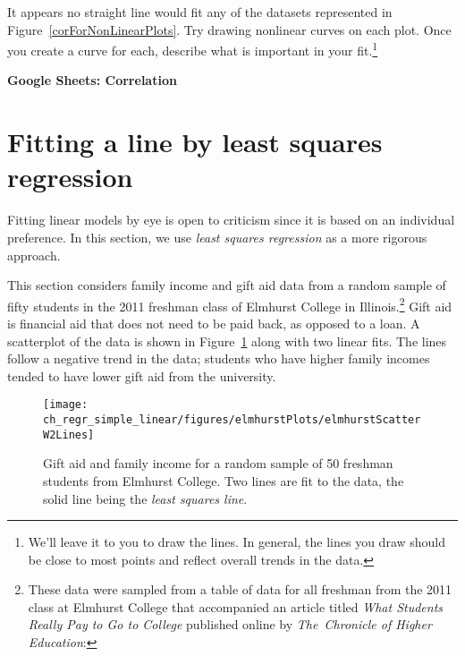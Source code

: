 \begin{exercise}
It appears no straight line would fit any of the datasets represented in Figure~\ref{corForNonLinearPlots}. Try drawing nonlinear curves on each plot. Once you create a curve for each, describe what is important in your fit.\footnote{We'll leave it to you to draw the lines. In general, the lines you draw should be close to most points and reflect overall trends in the data.}
\end{exercise}

\noindent\Large{\textbf{ {\color{ForestGreen} Google Sheets: Correlation}}}
\normalsize

\section[Fitting a line by least squares regression]{Fitting a line by least squares regression ~}
\label{fittingALineByLSR}


Fitting linear models by eye is open to criticism since it is based on an individual preference. In this section, we use \emph{least squares regression} as a more rigorous approach.

This section considers family income and gift aid data from a random sample of fifty students in the 2011 freshman class of Elmhurst College in Illinois.\footnote{These data were sampled from a table of data for all freshman from the 2011 class at Elmhurst College that accompanied an article titled \emph{What Students Really Pay to Go to College} published online by \emph{The~Chronicle of Higher Education}: } Gift aid is financial aid that does not need to be paid back, as opposed to a loan. A scatterplot of the data is shown in Figure~\ref{elmhurstScatterW2Lines} along with two linear fits. The lines follow a negative trend in the data; students who have higher family incomes tended to have lower gift aid from the university.

\begin{figure}[h]
\centering
\texttt{[image: ch\_regr\_simple\_linear/figures/elmhurstPlots/elmhurstScatterW2Lines]}
\caption{Gift aid and family income for a random sample of 50 freshman students from Elmhurst College. Two lines are fit to the data, the solid line being the \emph{least squares line}.}
\label{elmhurstScatterW2Lines}
\end{figure}

